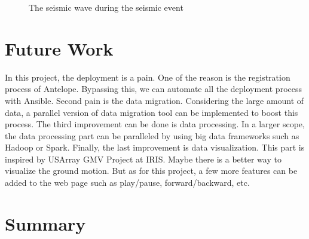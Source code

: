 \documentclass[9pt,twocolumn,twoside]{../../styles/osajnl}
\begin{document}
\begin{figure}[htbp]
\centering
{}
\caption{The seismic wave during the seismic event}
\label{fig:visual-wave}
\end{figure}

\section{Future Work}

In this project, the deployment is a pain. One of the reason is the registration process of Antelope. Bypassing this, we can automate all the deployment process with Ansible. Second pain is the data migration. Considering the large amount of data, a parallel version of data migration tool can be implemented to boost this process. The third improvement can be done is data processing. In a larger scope, the data processing part can be paralleled by using big data frameworks such as Hadoop or Spark. Finally, the last improvement is data visualization. This part is inspired by USArray GMV Project at IRIS. Maybe there is a better way to visualize the ground motion. But as for this project, a few more features can be added to the web page such as play/pause, forward/backward, etc.


\section{Summary}
\end{document}

